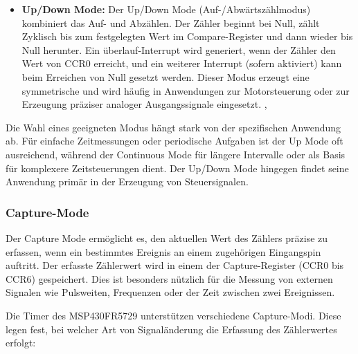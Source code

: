 \begin{itemize}
	\item \textbf{Up/Down Mode:} Der Up/Down Mode (Auf-/Abw\"artsz\"ahlmodus) kombiniert das Auf- und Abz\"ahlen. Der Z\"ahler beginnt bei Null, z\"ahlt Zyklisch bis zum festgelegten Wert im Compare-Register und dann wieder bis Null herunter. Ein \"uberlauf-Interrupt wird generiert, wenn der Z\"ahler den Wert von CCR0 erreicht, und ein weiterer Interrupt (sofern aktiviert) kann beim Erreichen von Null gesetzt werden.  Dieser Modus erzeugt eine symmetrische  und wird h\"aufig in Anwendungen zur Motorsteuerung oder zur Erzeugung pr\"aziser analoger Ausgangssignale eingesetzt. ,
\end{itemize}


Die Wahl eines geeigneten Modus h\"angt stark von der spezifischen Anwendung ab. F\"ur einfache Zeitmessungen oder periodische Aufgaben ist der Up Mode oft ausreichend, w\"ahrend der Continuous Mode f\"ur l\"angere Intervalle oder als Basis f\"ur komplexere Zeitsteuerungen dient. Der Up/Down Mode hingegen findet seine Anwendung prim\"ar in der Erzeugung von Steuersignalen.

\subsubsection{Capture-Mode}
\label{Timer_CaptureMode}

Der Capture Mode erm\"oglicht es, den aktuellen Wert des Z\"ahlers pr\"azise zu erfassen, wenn ein bestimmtes Ereignis an einem zugeh\"origen Eingangspin auftritt. Der erfasste Z\"ahlerwert wird in einem der Capture-Register (CCR0 bis CCR6) gespeichert. Dies ist besonders n\"utzlich f\"ur die Messung von externen Signalen wie Pulsweiten, Frequenzen oder der Zeit zwischen zwei Ereignissen.

Die Timer des MSP430FR5729 unterst\"utzen verschiedene Capture-Modi. Diese legen fest, bei welcher Art von Signal\"anderung die Erfassung des Z\"ahlerwertes erfolgt:

